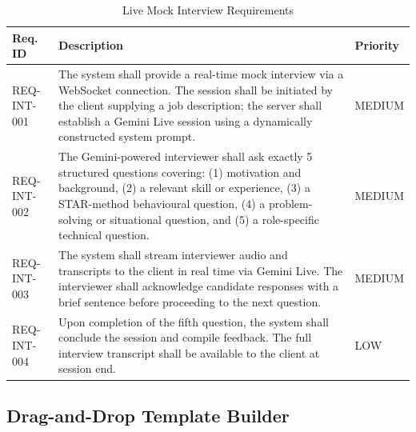 \documentclass[12pt, a4paper, oneside]{report}
\begin{document}
\begin{table}[H]
\centering
\caption{Live Mock Interview Requirements}
\label{tab:req_interview}
\renewcommand{\arraystretch}{1.5}
\begin{tabularx}{\textwidth}{|p{3cm}|X|p{2cm}|}
\hline
\textbf{Req. ID} & \textbf{Description} & \textbf{Priority} \\
\hline
REQ-INT-001 & The system shall provide a real-time mock interview via a WebSocket connection. The session shall be initiated by the client supplying a job description; the server shall establish a Gemini Live session \cite{geminidocs2024} using a dynamically constructed system prompt. & MEDIUM \\
\hline
REQ-INT-002 & The Gemini-powered interviewer \cite{gemini2023} shall ask exactly 5 structured questions covering: (1) motivation and background, (2) a relevant skill or experience, (3) a STAR-method behavioural question, (4) a problem-solving or situational question, and (5) a role-specific technical question. & MEDIUM \\
\hline
REQ-INT-003 & The system shall stream interviewer audio and transcripts to the client in real time via Gemini Live. The interviewer shall acknowledge candidate responses with a brief sentence before proceeding to the next question. & MEDIUM \\
\hline
REQ-INT-004 & Upon completion of the fifth question, the system shall conclude the session and compile feedback. The full interview transcript shall be available to the client at session end. & LOW \\
\hline
\end{tabularx}
\end{table}

\subsection{Drag-and-Drop Template Builder}
\end{document}
